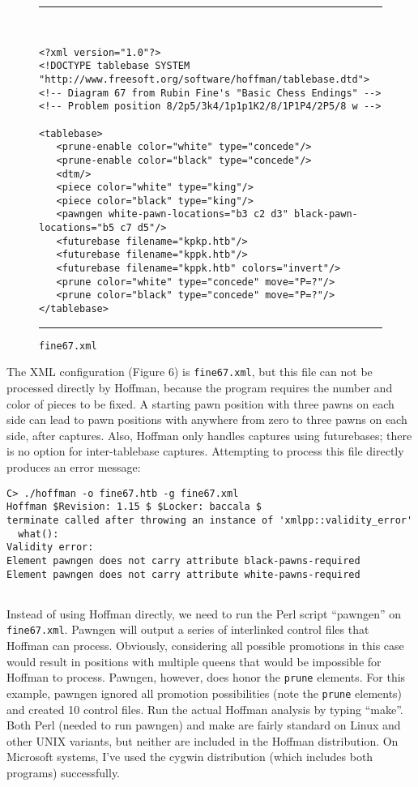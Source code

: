\documentclass[11pt]{article}
\begin{document}
\begin{figure}
\hrule\ 
{\small\begin{verbatim}
<?xml version="1.0"?>
<!DOCTYPE tablebase SYSTEM "http://www.freesoft.org/software/hoffman/tablebase.dtd">
<!-- Diagram 67 from Rubin Fine's "Basic Chess Endings" -->
<!-- Problem position 8/2p5/3k4/1p1p1K2/8/1P1P4/2P5/8 w -->

<tablebase>
   <prune-enable color="white" type="concede"/>
   <prune-enable color="black" type="concede"/>
   <dtm/>
   <piece color="white" type="king"/>
   <piece color="black" type="king"/>
   <pawngen white-pawn-locations="b3 c2 d3" black-pawn-locations="b5 c7 d5"/>
   <futurebase filename="kpkp.htb"/>
   <futurebase filename="kppk.htb"/>
   <futurebase filename="kppk.htb" colors="invert"/>
   <prune color="white" type="concede" move="P=?"/>
   <prune color="black" type="concede" move="P=?"/>
</tablebase>
\end{verbatim}}
\hrule
\caption{\tt fine67.xml}
\end{figure}

The XML configuration (Figure 6) is {\tt fine67.xml}, but this file
can not be processed directly by Hoffman, because the program requires
the number and color of pieces to be fixed.  A starting pawn position
with three pawns on each side can lead to pawn positions with anywhere
from zero to three pawns on each side, after captures.  Also, Hoffman
only handles captures using futurebases; there is no option for
inter-tablebase captures.  Attempting to process this file
directly produces an error message:

\begin{verbatim}
C> ./hoffman -o fine67.htb -g fine67.xml
Hoffman $Revision: 1.15 $ $Locker: baccala $
terminate called after throwing an instance of 'xmlpp::validity_error'
  what():
Validity error:
Element pawngen does not carry attribute black-pawns-required
Element pawngen does not carry attribute white-pawns-required


\end{verbatim}

Instead of using Hoffman directly, we need to run the Perl script ``pawngen'' on
{\tt fine67.xml}.  Pawngen will
output a series of interlinked control files that Hoffman can process.
Obviously, considering all possible promotions in this case would
result in positions with multiple queens that would be impossible for
Hoffman to process.  Pawngen, however, does honor the {\tt prune}
elements.  For this example, pawngen ignored all promotion
possibilities (note the {\tt prune} elements) and created 10 control
files.  Run the actual Hoffman analysis by typing ``make''.
Both Perl (needed to run pawngen) and make are fairly standard on
Linux and other UNIX variants, but neither are included in the Hoffman
distribution.  On Microsoft systems, I've used the cygwin distribution
(which includes both programs) successfully.
\end{document}
